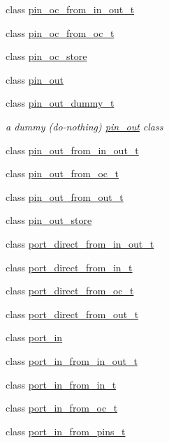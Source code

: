 \begin{DoxyCompactItemize}
class \hyperlink{classhwlib_1_1pin__oc__from__in__out__t}{pin\+\_\+oc\+\_\+from\+\_\+in\+\_\+out\+\_\+t}
\item 
class \hyperlink{classhwlib_1_1pin__oc__from__oc__t}{pin\+\_\+oc\+\_\+from\+\_\+oc\+\_\+t}
\item 
class \hyperlink{classhwlib_1_1pin__oc__store}{pin\+\_\+oc\+\_\+store}
\item 
class \hyperlink{classhwlib_1_1pin__out}{pin\+\_\+out}
\item 
class \hyperlink{classhwlib_1_1pin__out__dummy__t}{pin\+\_\+out\+\_\+dummy\+\_\+t}
\begin{DoxyCompactList}\small\item\em a dummy (do-\/nothing) \hyperlink{classhwlib_1_1pin__out}{pin\+\_\+out} class \end{DoxyCompactList}\item 
class \hyperlink{classhwlib_1_1pin__out__from__in__out__t}{pin\+\_\+out\+\_\+from\+\_\+in\+\_\+out\+\_\+t}
\item 
class \hyperlink{classhwlib_1_1pin__out__from__oc__t}{pin\+\_\+out\+\_\+from\+\_\+oc\+\_\+t}
\item 
class \hyperlink{classhwlib_1_1pin__out__from__out__t}{pin\+\_\+out\+\_\+from\+\_\+out\+\_\+t}
\item 
class \hyperlink{classhwlib_1_1pin__out__store}{pin\+\_\+out\+\_\+store}
\item 
class \hyperlink{classhwlib_1_1port__direct__from__in__out__t}{port\+\_\+direct\+\_\+from\+\_\+in\+\_\+out\+\_\+t}
\item 
class \hyperlink{classhwlib_1_1port__direct__from__in__t}{port\+\_\+direct\+\_\+from\+\_\+in\+\_\+t}
\item 
class \hyperlink{classhwlib_1_1port__direct__from__oc__t}{port\+\_\+direct\+\_\+from\+\_\+oc\+\_\+t}
\item 
class \hyperlink{classhwlib_1_1port__direct__from__out__t}{port\+\_\+direct\+\_\+from\+\_\+out\+\_\+t}
\item 
class \hyperlink{classhwlib_1_1port__in}{port\+\_\+in}
\item 
class \hyperlink{classhwlib_1_1port__in__from__in__out__t}{port\+\_\+in\+\_\+from\+\_\+in\+\_\+out\+\_\+t}
\item 
class \hyperlink{classhwlib_1_1port__in__from__in__t}{port\+\_\+in\+\_\+from\+\_\+in\+\_\+t}
\item 
class \hyperlink{classhwlib_1_1port__in__from__oc__t}{port\+\_\+in\+\_\+from\+\_\+oc\+\_\+t}
\item 
class \hyperlink{classhwlib_1_1port__in__from__pins__t}{port\+\_\+in\+\_\+from\+\_\+pins\+\_\+t}

\end{DoxyCompactItemize}
